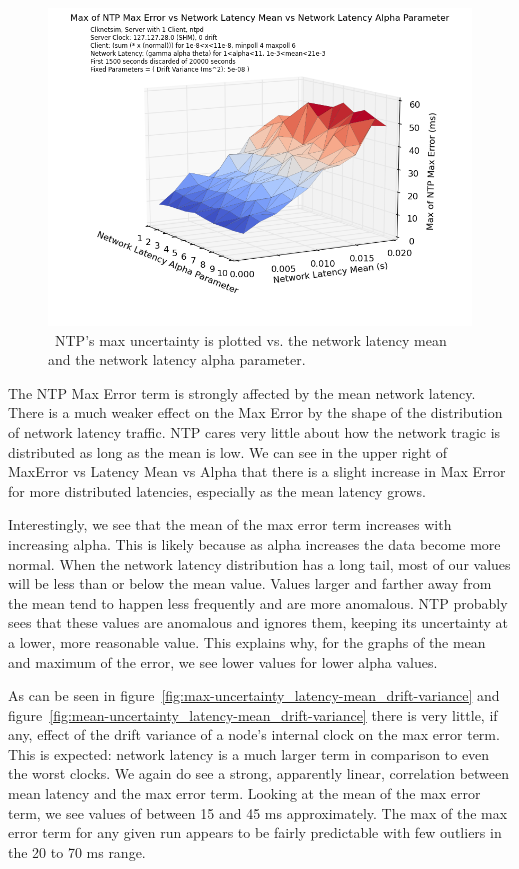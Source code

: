 \begin{figure}[h]
  \caption{~NTP's max uncertainty is plotted vs. the network latency mean and the network latency alpha parameter.}
  \label{fig:max-uncertainty_latency-mean_latency-alpha}
  \includegraphics[width=0.8\linewidth]{max_error-latency_mean-latency_alpha.png}
\end{figure}

The NTP Max Error term is strongly affected by the mean network
latency. There is a much weaker effect on the Max Error by the shape
of the distribution of network latency traffic. NTP cares very little
about how the network tragic is distributed as long as the mean is
low. We can see in the upper right of MaxError vs Latency Mean vs
Alpha that there is a slight increase in Max Error for more
distributed latencies, especially as the mean latency grows.

Interestingly, we see that the mean of the max error term increases
with increasing alpha. This is likely because as alpha increases the
data become more normal. When the network latency distribution has a
long tail, most of our values will be less than or below the mean
value. Values larger and farther away from the mean tend to happen
less frequently and are more anomalous. NTP probably sees that these
values are anomalous and ignores them, keeping its uncertainty at a
lower, more reasonable value. This explains why, for the graphs of the
mean and maximum of the error, we see lower values for lower alpha
values.

As can be seen in figure~\ref{fig:max-uncertainty_latency-mean_drift-variance} and 
figure~\ref{fig:mean-uncertainty_latency-mean_drift-variance} there is very little, if any,
effect of the drift variance of a node's internal clock on the max
error term. This is expected: network latency is a much larger term in
comparison to even the worst clocks. We again do see a strong,
apparently linear, correlation between mean latency and the max error
term. Looking at the mean of the max error term, we see values of
between 15 and 45 ms approximately. The max of the max error term for
any given run appears to be fairly predictable with few outliers in
the 20 to 70 ms range. 

